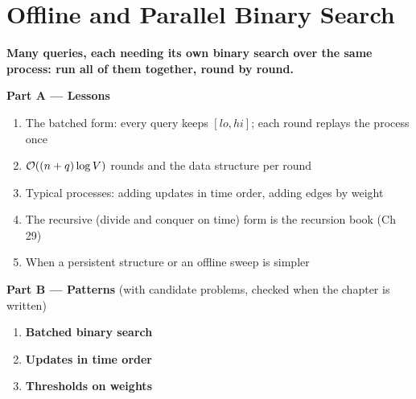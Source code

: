 \chapter{Offline and Parallel Binary Search}
\label{ch:offline}

\begin{tcolorbox}[enhanced, colback=white, colframe=secondaryblue, boxrule=1pt, arc=2mm]
\textbf{\large\textcolor{primaryblue}{Many queries, each needing its own binary search over the same process: run all of them together, round by round.}}
\end{tcolorbox}


\begin{plannedbox}
\textbf{Part A --- Lessons}
\begin{enumerate}[leftmargin=*, label=\textbf{A\arabic*.}, itemsep=1pt]
    \item The batched form: every query keeps $[lo, hi]$; each round replays the process once
    \item $\mathcal{O}((n + q)\log V)$ rounds and the data structure per round
    \item Typical processes: adding updates in time order, adding edges by weight
    \item The recursive (divide and conquer on time) form is the recursion book (Ch 29)
    \item When a persistent structure or an offline sweep is simpler
\end{enumerate}
\textbf{Part B --- Patterns} (with candidate problems, checked when the chapter is written)
\begin{enumerate}[leftmargin=*, label=\textbf{P\arabic*.}, itemsep=1pt]
    \item \textbf{Batched binary search}
    \item \textbf{Updates in time order}
    \item \textbf{Thresholds on weights}
\end{enumerate}
\end{plannedbox}
